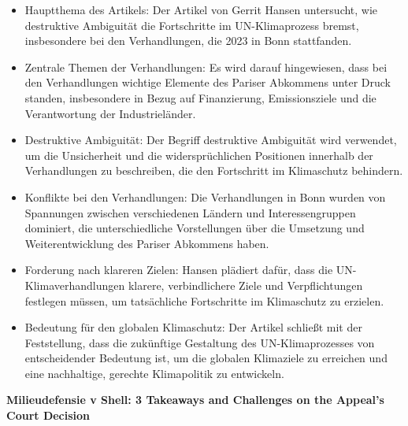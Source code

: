 \documentclass[a4paper, 12pt]{article} %
\begin{document}
 \begin{itemize}
   \item Hauptthema des Artikels: Der Artikel von Gerrit Hansen untersucht, wie destruktive Ambiguität die Fortschritte im UN-Klimaprozess bremst, insbesondere bei den Verhandlungen, die 2023 in Bonn stattfanden.
   \item Zentrale Themen der Verhandlungen: Es wird darauf hingewiesen, dass bei den Verhandlungen wichtige Elemente des Pariser Abkommens unter Druck standen, insbesondere in Bezug auf Finanzierung, Emissionsziele und die Verantwortung der Industrieländer.
   \item Destruktive Ambiguität: Der Begriff \glqq{}destruktive Ambiguität\grqq{} wird verwendet, um die Unsicherheit und die widersprüchlichen Positionen innerhalb der Verhandlungen zu beschreiben, die den Fortschritt im Klimaschutz behindern.
   \item Konflikte bei den Verhandlungen: Die Verhandlungen in Bonn wurden von Spannungen zwischen verschiedenen Ländern und Interessengruppen dominiert, die unterschiedliche Vorstellungen über die Umsetzung und Weiterentwicklung des Pariser Abkommens haben.
   \item Forderung nach klareren Zielen: Hansen plädiert dafür, dass die UN-Klimaverhandlungen klarere, verbindlichere Ziele und Verpflichtungen festlegen müssen, um tatsächliche Fortschritte im Klimaschutz zu erzielen.
   \item Bedeutung für den globalen Klimaschutz: Der Artikel schließt mit der Feststellung, dass die zukünftige Gestaltung des UN-Klimaprozesses von entscheidender Bedeutung ist, um die globalen Klimaziele zu erreichen und eine nachhaltige, gerechte Klimapolitik zu entwickeln.
 \end{itemize}

 \textbf{\cite{hesselman2024milieudefensie} Milieudefensie v Shell: 3 Takeaways and Challenges on the Appeal’s Court Decision}
\end{document}
